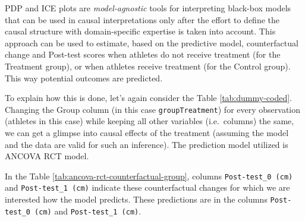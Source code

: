 \documentclass[
]{book}
\begin{document}
PDP and ICE plots are \emph{model-agnostic} tools for interpreting black-box models that can be used in causal interpretations only after the effort to define the causal structure with domain-specific expertise is taken into account. This approach can be used to estimate, based on the predictive model, counterfactual change and Post-test scores when athletes do not receive treatment (for the Treatment group), or when athletes receive treatment (for the Control group). This way potential outcomes are predicted.

To explain how this is done, let's again consider the Table \ref{tab:dummy-coded}. Changing the Group column (in this case \texttt{groupTreatment}) for every observation (athletes in this case) while keeping all other variables (i.e.~columns) the same, we can get a glimpse into causal effects of the treatment (assuming the model and the data are valid for such an inference). The prediction model utilized is ANCOVA RCT model.

In the Table \ref{tab:ancova-rct-counterfactual-group}, columns \texttt{Post-test\_0\ (cm)} and \texttt{Post-test\_1\ (cm)} indicate these counterfactual changes for which we are interested how the model predicts. These predictions are in the columns \texttt{Post-test\_0\ (cm)} and \texttt{Post-test\_1\ (cm)}.
\end{document}
